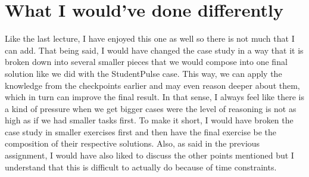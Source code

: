 \documentclass[12pt]{article}
\begin{document}
\section{What I would've done differently}
Like the last lecture, I have enjoyed this one as well so there is not much that I can add.
\newline
That being said, I would have changed the case study in a way that it is broken down into several smaller pieces that we would compose into one final solution like we did with the StudentPulse case.
\newline
This way, we can apply the knowledge from the checkpoints earlier and may even reason deeper about them, which in turn can improve the final result.
\newline
In that sense, I always feel like there is a kind of pressure when we get bigger cases were the level of reasoning is not as high as if we had smaller tasks first. To make it short, I would have broken the case study in smaller exercises first and then have the final exercise be the composition of their respective solutions.
\newline
Also, as said in the previous assignment, I would have also liked to discuss the other points mentioned but I understand that this is difficult to actually do because of time constraints.
\end{document}
